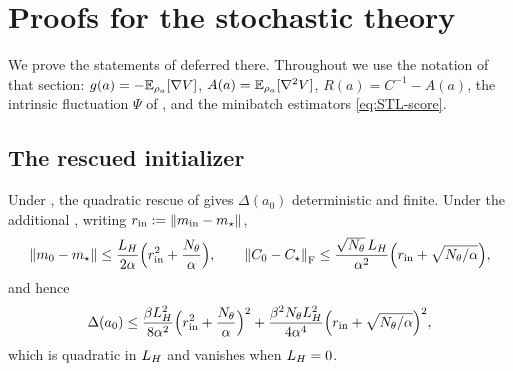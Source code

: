 \section{Proofs for the stochastic theory}\label{app:stoch-proofs}

We prove the statements of  deferred there. Throughout
we use the notation of that section: $g(a)=-\mathbb{E}_{\rho_a}[\nabla V]$, $A(a)=\mathbb{E}_{\rho_a}[\nabla^2V]$,
$R(a)=C^{-1}-A(a)$, the intrinsic fluctuation $\Psi$ of , and the minibatch estimators
\eqref{eq:STL-score}.

\subsection{The rescued initializer}

\begin{lemma}
\label{lem:rescue-energy}
Under , the quadratic rescue of  gives $\Delta(a_0)$ deterministic and finite.
Under the additional , writing $r_{\mathrm{in}}:=\left\lVert m_{\mathrm{in}}-m_\star\right\rVert$,
\[
    \left\lVert m_0-m_\star\right\rVert\leq\frac{L_H}{2\alpha}\Bigl(r_{\mathrm{in}}^2+\frac{N_\theta}\alpha\Bigr),
    \qquad
    \left\lVert C_0-C_\star\right\rVert_{\mathrm{F}}\leq\frac{\sqrt{N_\theta}\,L_H}{\alpha^2}\Bigl(r_{\mathrm{in}}+\sqrt{N_\theta/\alpha}\Bigr),
\]
and hence
\[
    \Delta(a_0)
    \leq
    \frac{\beta L_H^2}{8\alpha^2}\Bigl(r_{\mathrm{in}}^2+\frac{N_\theta}\alpha\Bigr)^2
    +\frac{\beta^2N_\theta L_H^2}{4\alpha^4}\Bigl(r_{\mathrm{in}}+\sqrt{N_\theta/\alpha}\Bigr)^2,
\]
which is quadratic in $L_H$ and vanishes when $L_H=0$.
\end{lemma}


